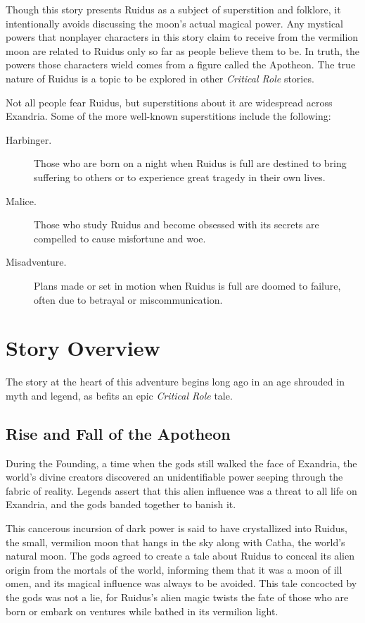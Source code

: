 \documentclass[a4paper, 11pt, bg=full, twocolumn, nooutline]{dndbook}
\begin{document}
Though this story presents Ruidus as a subject of superstition and folklore, it intentionally avoids discussing the moon's actual magical power. Any mystical powers that nonplayer characters in this story claim to receive from the vermilion moon are related to Ruidus only so far as people believe them to be. In truth, the powers those characters wield comes from a figure called the Apotheon. The true nature of Ruidus is a topic to be explored in other \textit{Critical Role} stories.

Not all people fear Ruidus, but superstitions about it are widespread across Exandria. Some of the more well-known superstitions include the following:

\begin{description}
\item[Harbinger.] Those who are born on a night when Ruidus is full are destined to bring suffering to others or to experience great tragedy in their own lives.
\item[Malice.] Those who study Ruidus and become obsessed with its secrets are compelled to cause misfortune and woe.
\item[Misadventure.] Plans made or set in motion when Ruidus is full are doomed to failure, often due to betrayal or miscommunication.
\end{description}
\section{Story Overview}

The story at the heart of this adventure begins long ago in an age shrouded in myth and legend, as befits an epic \textit{Critical Role} tale.

\subsection{Rise and Fall of the Apotheon}


During the Founding, a time when the gods still walked the face of Exandria, the world's divine creators discovered an unidentifiable power seeping through the fabric of reality. Legends assert that this alien influence was a threat to all life on Exandria, and the gods banded together to banish it.

This cancerous incursion of dark power is said to have crystallized into Ruidus, the small, vermilion moon that hangs in the sky along with Catha, the world's natural moon. The gods agreed to create a tale about Ruidus to conceal its alien origin from the mortals of the world, informing them that it was a moon of ill omen, and its magical influence was always to be avoided. This tale concocted by the gods was not a lie, for Ruidus's alien magic twists the fate of those who are born or embark on ventures while bathed in its vermilion light.
\end{document}
